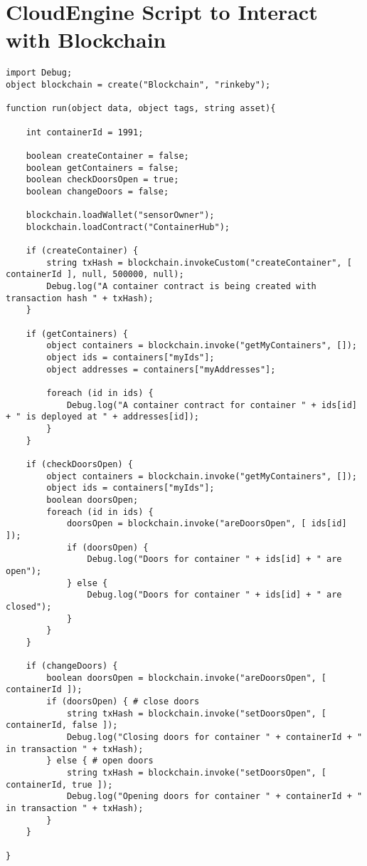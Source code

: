 \documentclass[12pt]{article}
\begin{document}
\section{CloudEngine Script to Interact with Blockchain}
	
	\begin{lstlisting}[frame=single,basicstyle=\tiny]
import Debug;
object blockchain = create("Blockchain", "rinkeby");

function run(object data, object tags, string asset){

	int containerId = 1991;

	boolean createContainer = false;
	boolean getContainers = false;
	boolean checkDoorsOpen = true;
	boolean changeDoors = false;

	blockchain.loadWallet("sensorOwner");
	blockchain.loadContract("ContainerHub");

	if (createContainer) {
	    string txHash = blockchain.invokeCustom("createContainer", [ containerId ], null, 500000, null);
	    Debug.log("A container contract is being created with transaction hash " + txHash);
	}

	if (getContainers) {
	    object containers = blockchain.invoke("getMyContainers", []);
	    object ids = containers["myIds"];
	    object addresses = containers["myAddresses"];

	    foreach (id in ids) {
	        Debug.log("A container contract for container " + ids[id] + " is deployed at " + addresses[id]);
	    }
	}

	if (checkDoorsOpen) {
	    object containers = blockchain.invoke("getMyContainers", []);
	    object ids = containers["myIds"];
	    boolean doorsOpen;
	    foreach (id in ids) {
	        doorsOpen = blockchain.invoke("areDoorsOpen", [ ids[id] ]);
	        if (doorsOpen) {
	            Debug.log("Doors for container " + ids[id] + " are open");
	        } else {
	            Debug.log("Doors for container " + ids[id] + " are closed");
	        }
	    }
	}

	if (changeDoors) {
	    boolean doorsOpen = blockchain.invoke("areDoorsOpen", [ containerId ]);
	    if (doorsOpen) { # close doors
	        string txHash = blockchain.invoke("setDoorsOpen", [ containerId, false ]);
	        Debug.log("Closing doors for container " + containerId + " in transaction " + txHash);
	    } else { # open doors
	        string txHash = blockchain.invoke("setDoorsOpen", [ containerId, true ]);
	        Debug.log("Opening doors for container " + containerId + " in transaction " + txHash);
	    }
	}

}
	\end{lstlisting}
\end{document}
